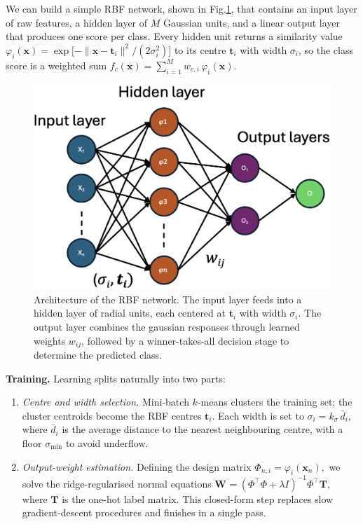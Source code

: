 \documentclass[twocolumn]{article} %
\begin{document}
We can build a simple RBF network, shown in Fig.\ref{fig:rbf-net}, that contains an input layer of
raw features, a hidden layer of \(M\) Gaussian units, and a linear
output layer that produces one score per class.  Every hidden unit
returns a similarity value
\(
  \varphi_i(\mathbf x)=
  \exp\!\bigl[-\|\mathbf x-\mathbf t_i\|^{2}/(2\sigma_i^{2})\bigr]
\)
to its centre \(\mathbf t_i\) with width \(\sigma_i\), so the class score
is a weighted sum
\(
  f_c(\mathbf x)=\sum_{i=1}^{M}w_{c,i}\,\varphi_i(\mathbf x).
\)

\begin{figure}[h]
  \centering
  \includegraphics[width=\linewidth]{figures/rbf_net/rbf_net.png}
  \caption{Architecture of the RBF network. The input layer feeds into a hidden layer of radial units, each centered at \(\mathbf{t}_i\) with width \(\sigma_i\). The output layer combines the gaussian responses through learned weights \(w_{ij}\), followed by a winner-takes-all decision stage to determine the predicted class.}
  \label{fig:rbf-net}
\end{figure}


\smallskip
\textbf{Training.}
Learning splits naturally into two parts:
\begin{enumerate}[leftmargin=1.5em,label=(\alph*)]
  \item \emph{Centre and width selection.}  
        Mini-batch \(k\)-means clusters the training set; the cluster
        centroids become the RBF centres \(\mathbf t_i\).
        Each width is set to
        \(\sigma_i = k_\sigma\,\bar d_i\), where \(\bar d_i\) is the
        average distance to the nearest neighbouring centre, with a floor
        \(\sigma_{\min}\) to avoid underflow.
  \item \emph{Output-weight estimation.}  
        Defining the design matrix
        \(
          \Phi_{n,i}=\varphi_i(\mathbf x_n),
        \)
        we solve the ridge-regularised normal equations
        \(
          \mathbf W=(\Phi^{\!\top}\Phi+\lambda I)^{-1}\Phi^{\!\top}\mathbf T,
        \)
        where \(\mathbf T\) is the one-hot label matrix.
        This closed-form step replaces slow gradient-descent procedures
        and finishes in a single pass.
\end{enumerate}
\end{document}
